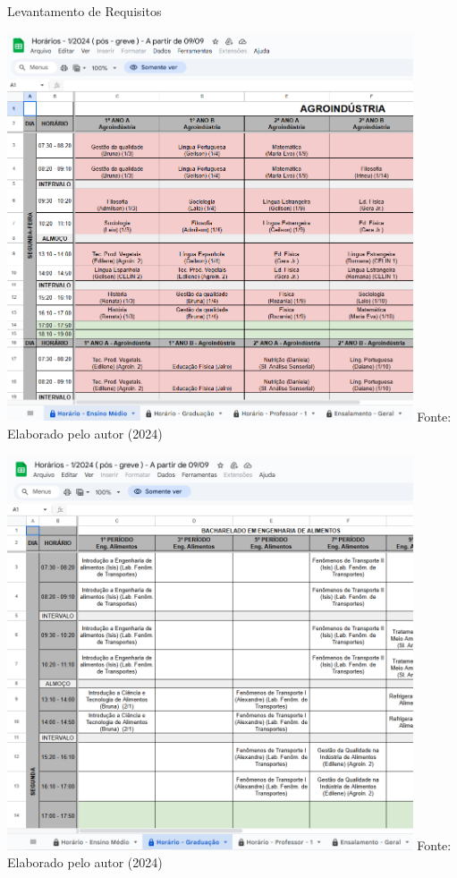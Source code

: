 \begin{frame}{Levantamento de Requisitos}
    \begin{minipage}{0.48\textwidth}
        \centering
        \includegraphics[width=0.9\textwidth]{figuras/plan-ant-1.png}
        \footnotesize Fonte: Elaborado pelo autor (2024)
    \end{minipage}
    \hfill
    \begin{minipage}{0.48\textwidth}
        \centering
        \includegraphics[width=0.9\textwidth]{figuras/plan-ant-2.png}
        \footnotesize Fonte: Elaborado pelo autor (2024)
    \end{minipage}
\end{frame}

